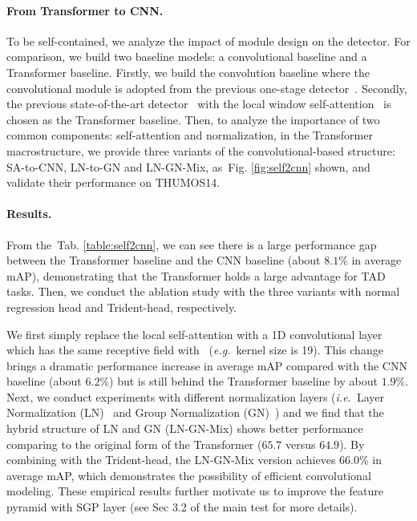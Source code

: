 \documentclass[10pt,twocolumn,letterpaper]{article}
\def\ie{{\em i.e.}}
\def\eg{{\em e.g.}}
\newcommand{\figref}[1]{Fig. \ref{#1}}
\newcommand{\tabref}[1]{Tab. \ref{#1}}
\begin{document}
\paragraph{From Transformer to CNN.}
To be self-contained, we analyze the impact of module design on the detector. 
For comparison, we build two baseline models: a convolutional baseline and a Transformer baseline. Firstly, we build the convolution baseline where the convolutional module is adopted from the previous one-stage detector~\cite{lin2021learning,zhang2022actionformer}. Secondly, the previous state-of-the-art detector~\cite{zhang2022actionformer} with the local window self-attention~\cite{beltagy2020longformer} is chosen as the Transformer baseline. Then, to analyze the importance of two common components: self-attention and normalization, in the Transformer~\cite{vaswani2017attention} macrostructure, we provide three variants of the convolutional-based structure: SA-to-CNN, LN-to-GN and LN-GN-Mix, as~\figref{fig:self2cnn} shown, and validate their performance on THUMOS14. 

\paragraph{Results.}
From the~\tabref{table:self2cnn}, we can see there is a large performance gap between the Transformer baseline and the CNN baseline (about $8.1\%$ in average mAP), demonstrating that the Transformer holds a large advantage for TAD tasks. 
Then, we conduct the ablation study with the three variants with normal regression head and Trident-head, respectively.

We first simply replace the local self-attention with a 1D convolutional layer which has the same receptive field with~\cite{zhang2022actionformer} (\eg~kernel size is 19). This change brings a dramatic performance increase in average mAP compared with the CNN baseline (about $6.2\%$) but is still behind the Transformer baseline by about $1.9\%$. Next, we conduct experiments with different normalization layers (\ie~Layer Normalization (LN)~\cite{ba2016layer} and Group Normalization (GN)~\cite{wu2018group}) and we find that the hybrid structure of LN and GN (LN-GN-Mix) shows better performance comparing to the original form of the Transformer ($65.7$ versus $64.9$). 
By combining with the Trident-head, the LN-GN-Mix version achieves $66.0\%$ in average mAP, which demonstrates the possibility of efficient convolutional modeling. These empirical results further motivate us to improve the feature pyramid with SGP layer (see Sec 3.2 of the main test for more details).
\end{document}
